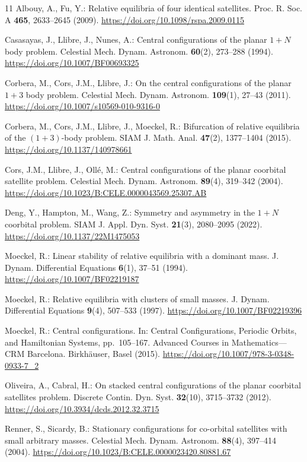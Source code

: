 \documentclass[11pt,a4paper]{article}
\numberwithin{equation}{section}
\theoremstyle{remark}
\newcommand{\interests}{}
\begin{document}
\ifdefempty{\interests}{}{%
\smallskip
\noindent\textbf{Competing interests.} \interests\par}

\begin{thebibliography}{11}
\setlength{\itemsep}{2pt}
\setlength{\parsep}{0pt}
Albouy, A., Fu, Y.: Relative equilibria of four identical satellites.
Proc. R. Soc. A \textbf{465}, 2633--2645 (2009).
\url{https://doi.org/10.1098/rspa.2009.0115}

Casasayas, J., Llibre, J., Nunes, A.: Central configurations of the planar $1+N$ body problem.
Celestial Mech. Dynam. Astronom. \textbf{60}(2), 273--288 (1994).
\url{https://doi.org/10.1007/BF00693325}

Corbera, M., Cors, J.M., Llibre, J.: On the central configurations of the planar $1+3$ body problem.
Celestial Mech. Dynam. Astronom. \textbf{109}(1), 27--43 (2011).
\url{https://doi.org/10.1007/s10569-010-9316-0}

Corbera, M., Cors, J.M., Llibre, J., Moeckel, R.: Bifurcation of relative equilibria of the $(1+3)$-body problem.
SIAM J. Math. Anal. \textbf{47}(2), 1377--1404 (2015).
\url{https://doi.org/10.1137/140978661}

Cors, J.M., Llibre, J., Oll\'e, M.: Central configurations of the planar coorbital satellite problem.
Celestial Mech. Dynam. Astronom. \textbf{89}(4), 319--342 (2004).
\url{https://doi.org/10.1023/B:CELE.0000043569.25307.AB}

Deng, Y., Hampton, M., Wang, Z.: Symmetry and asymmetry in the $1+N$ coorbital problem.
SIAM J. Appl. Dyn. Syst. \textbf{21}(3), 2080--2095 (2022).
\url{https://doi.org/10.1137/22M1475053}

Moeckel, R.: Linear stability of relative equilibria with a dominant mass.
J. Dynam. Differential Equations \textbf{6}(1), 37--51 (1994).
\url{https://doi.org/10.1007/BF02219187}

Moeckel, R.: Relative equilibria with clusters of small masses.
J. Dynam. Differential Equations \textbf{9}(4), 507--533 (1997).
\url{https://doi.org/10.1007/BF02219396}

Moeckel, R.: Central configurations. In: Central Configurations, Periodic Orbits, and Hamiltonian Systems,
pp.~105--167. Advanced Courses in Mathematics---CRM Barcelona.
Birkh\"auser, Basel (2015).
\url{https://doi.org/10.1007/978-3-0348-0933-7_2}

Oliveira, A., Cabral, H.: On stacked central configurations of the planar coorbital satellites problem.
Discrete Contin. Dyn. Syst. \textbf{32}(10), 3715--3732 (2012).
\url{https://doi.org/10.3934/dcds.2012.32.3715}

Renner, S., Sicardy, B.: Stationary configurations for co-orbital satellites with small arbitrary masses.
Celestial Mech. Dynam. Astronom. \textbf{88}(4), 397--414 (2004).
\url{https://doi.org/10.1023/B:CELE.0000023420.80881.67}
\end{thebibliography}
\end{document}
